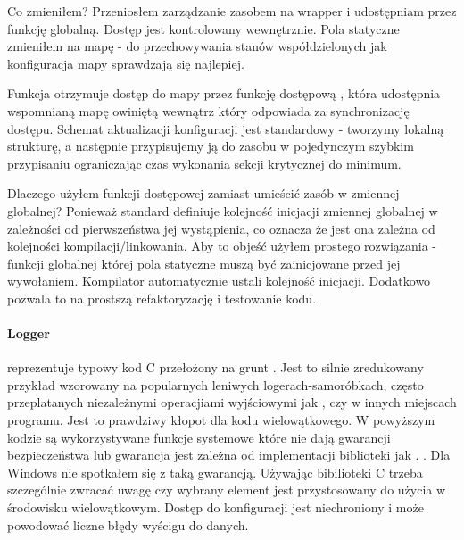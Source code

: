 Co zmieniłem?
Przeniosłem zarządzanie zasobem na wrapper  i udostępniam przez funkcję globalną. Dostęp jest kontrolowany wewnętrznie. Pola statyczne zmieniłem na mapę - do przechowywania stanów współdzielonych jak konfiguracja mapy sprawdzają się najlepiej.

Funkcja  otrzymuje dostęp do mapy przez funkcję dostępową , która udostępnia wspomnianą mapę owiniętą wewnątrz  który odpowiada za synchronizację dostępu. Schemat aktualizacji konfiguracji jest standardowy - tworzymy lokalną strukturę, a następnie przypisujemy ją do zasobu w pojedynczym szybkim przypisaniu ograniczając czas wykonania sekcji krytycznej do minimum.

Dlaczego użyłem funkcji dostępowej zamiast umieścić zasób w zmiennej globalnej?
Ponieważ standard definiuje kolejność inicjacji zmiennej globalnej w zależności od pierwszeństwa jej wystąpienia, co oznacza że jest ona zależna od kolejności kompilacji/linkowania. Aby to objeść użyłem prostego rozwiązania - funkcji globalnej której pola statyczne muszą być zainicjowane przed jej wywołaniem. Kompilator automatycznie ustali kolejność inicjacji. Dodatkowo pozwala to na prostszą refaktoryzację i testowanie kodu.

\paragraph{Logger}
 reprezentuje typowy kod C przełożony na grunt \Cpp{}. Jest to silnie zredukowany przykład wzorowany na popularnych leniwych logerach-samoróbkach, często przeplatanych niezależnymi operacjiami wyjściowymi jak , czy  w innych miejscach programu. Jest to prawdziwy kłopot dla kodu wielowątkowego.
W powyższym kodzie są wykorzystywane funkcje systemowe które nie dają gwarancji bezpieczeństwa lub gwarancja jest zależna od implementacji biblioteki jak . . Dla Windows nie spotkałem się z taką gwarancją. Używając bibilioteki C trzeba szczególnie zwracać uwagę czy wybrany element jest przystosowany do użycia w środowisku wielowątkowym. Dostęp do konfiguracji jest niechroniony i może powodować liczne błędy wyścigu do danych.

